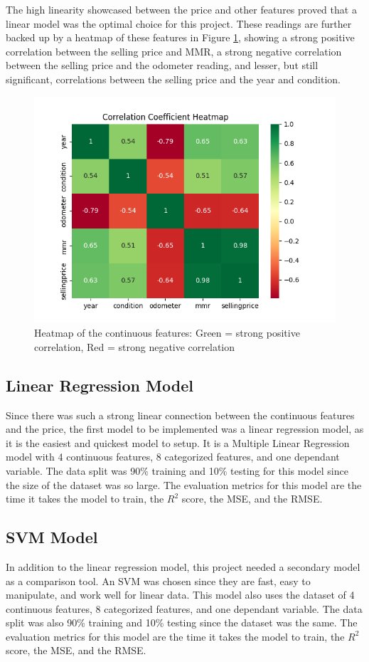 \documentclass[compsoc]{IEEEtran}
\begin{document}
The high linearity showcased between the price and other features proved that a linear model was the optimal choice for this project. These readings are further backed up by a heatmap of these features in Figure \ref{fig:heatmap}, showing a strong positive correlation between the selling price and MMR, a strong negative correlation between the selling price and the odometer reading, and lesser, but still significant, correlations between the selling price and the year and condition.

\begin{figure}[h]
    \centering
    \includegraphics[width=.48\textwidth]{images/heatmap.png}
    \caption{Heatmap of the continuous features: Green = strong positive correlation, Red = strong negative correlation}
    \label{fig:heatmap}
\end{figure}

\subsection{Linear Regression Model}
Since there was such a strong linear connection between the continuous features and the price, the first model to be implemented was a linear regression model, as it is the easiest and quickest model to setup. It is a Multiple Linear Regression model \cite{model:multiple_linear_regression} with 4 continuous features, 8 categorized features, and one dependant variable. The data split was 90\% training and 10\% testing for this model since the size of the dataset was so large. The evaluation metrics for this model are the time it takes the model to train, the $R^2$ score, the MSE, and the RMSE.
\subsection{SVM Model}
In addition to the linear regression model, this project needed a secondary model as a comparison tool. An SVM \cite{model:svm} was chosen since they are fast, easy to manipulate, and work well for linear data. This model also uses the dataset of 4 continuous features, 8 categorized features, and one dependant variable. The data split was also 90\% training and 10\% testing since the dataset was the same. The evaluation metrics for this model are the time it takes the model to train, the $R^2$ score, the MSE, and the RMSE.
\end{document}

